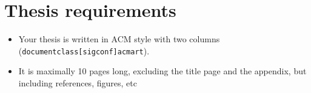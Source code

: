 \documentclass[a4paper]{article} %
\begin{document}
%

\pagebreak

\tableofcontents

\pagebreak

\begin{abstract}
\end{abstract}


\section*{Thesis requirements}
\begin{itemize}
\item Your thesis is written in ACM style with two columns  (\texttt{documentclass[sigconf]{acmart}}).
\item It is maximally 10 pages long, excluding the title page and the appendix, but including references, figures, etc 
\end{itemize}


\pagebreak















%



%
 
\end{document}
